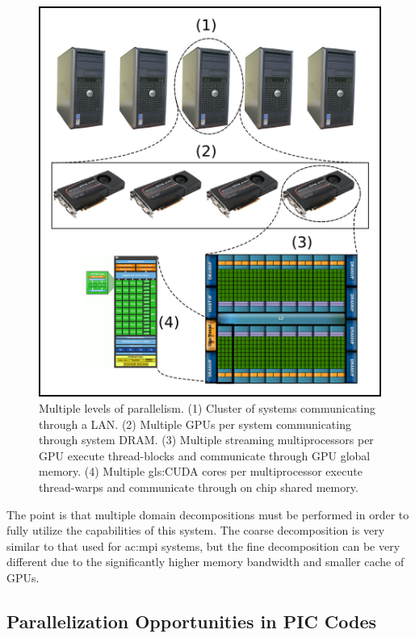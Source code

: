\begin{figure}
\begin{center}
\includegraphics[width=5in]{introduction/multi_parallel.png}
\end{center}
\caption[Multiple levels of parallelism.]{Multiple levels of parallelism. (1) Cluster of systems communicating through a LAN. (2) Multiple GPUs per system communicating through system DRAM. (3) Multiple streaming multiprocessors per GPU execute thread-blocks and communicate through GPU global memory. (4) Multiple \gls{gls:CUDA} cores per multiprocessor execute thread-warps and communicate through on chip shared memory. }
\label{fig:multiparallel}
\end{figure}

The point is that multiple domain decompositions must be performed in order to fully utilize the capabilities of this system. The coarse decomposition is very similar to that used for \gls{ac:mpi} systems, but the fine decomposition can be very different due to the significantly higher memory bandwidth and smaller cache of GPUs. 

		\subsection{Parallelization Opportunities in PIC Codes}

